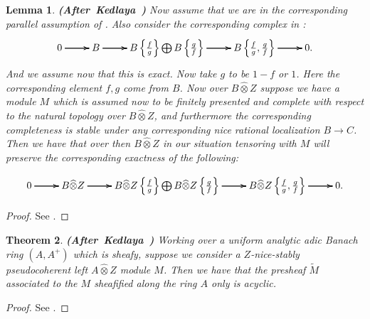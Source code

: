 \documentclass[12pt]{amsart}
\newtheorem{theorem}{Theorem}[section]
\newtheorem{lemma}[theorem]{Lemma}
\theoremstyle{definition}
\numberwithin{equation}{section}
\begin{document}
\begin{lemma} \mbox{\bf{(After Kedlaya \cite[Lemma 1.9.7]{Ked2})}}
Now assume that we are in the corresponding parallel assumption of \cite[1.7.1]{Ked2}. Also consider the corresponding complex in \cite[1.6.15.1]{Ked2}:
\[
\xymatrix@C+0pc@R+0pc{
0 \ar[r] \ar[r] \ar[r] &B \ar[r] \ar[r] \ar[r] &B\left\{\frac{f}{g}\right\}\bigoplus B\left\{\frac{g}{f}\right\} \ar[r] \ar[r] \ar[r] &B\left\{\frac{f}{g},\frac{g}{f}\right\} \ar[r] \ar[r] \ar[r] &0.
}
\]	
And we assume now that this is exact. Now take $g$ to be $1-f$ or $1$. Here the corresponding element $f,g$ come from $B$. Now over $B\widehat{\otimes}Z$ suppose we have a module $M$ which is assumed now to be finitely presented and complete with respect to the natural topology over $B\widehat{\otimes}Z$, and furthermore the corresponding completeness is stable under any corresponding nice rational localization $B\rightarrow C$. Then we have that over then $B\widehat{\otimes}Z$ in our situation tensoring with $M$ will preserve the corresponding exactness of the following:

\[
\xymatrix@C+0pc@R+0pc{
0 \ar[r] \ar[r] \ar[r] &B\widehat{\otimes}Z \ar[r] \ar[r] \ar[r] &B\widehat{\otimes}Z \left\{\frac{f}{g}\right\}\bigoplus B\widehat{\otimes}Z \left\{\frac{g}{f}\right\} \ar[r] \ar[r] \ar[r] &B\widehat{\otimes}Z \left\{\frac{f}{g},\frac{g}{f}\right\} \ar[r] \ar[r] \ar[r] &0.
}
\]	



	
\end{lemma}





\begin{proof}
See \cite[Lemma 1.9.7]{Ked2}.	
\end{proof}



\begin{theorem} \mbox{\bf{(After Kedlaya \cite[Corollary 1.9.8]{Ked2})}}
Working over a uniform analytic adic Banach ring $(A,A^+)$ which is sheafy, suppose we consider a $Z$-nice-stably pseudocoherent left $A\widehat{\otimes}Z$ module $M$. Then we have that the presheaf $\widetilde{M}$ associated to the $M$ sheafified along the ring $A$ only is acyclic.
	
\end{theorem}


\begin{proof}
See \cite[Corollary 1.9.8]{Ked2}.	
\end{proof}
\end{document}
